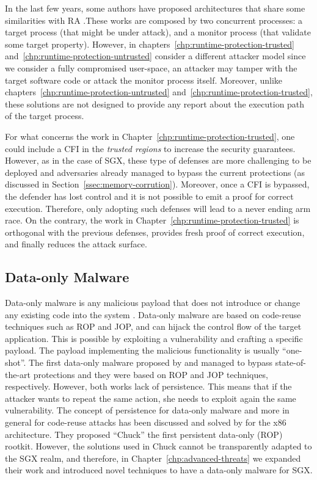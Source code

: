 In the last few years, some authors have proposed architectures that share some 
similarities with RA 
\citep{Ding:2017:EPP:3241189.3241201,Liu:2018:RED:3243734.3243826,Hu:2018:EUC:3243734.3243797}.These
works are composed by two concurrent processes: a target process (that might 
be under attack), and a monitor process (that validate some target property).
However, in chapters~\ref{chp:runtime-protection-trusted} 
and~\ref{chp:runtime-protection-untrusted} consider a different attacker model 
since we consider a fully compromised user-space, \ie an attacker may tamper 
with the target software code or attack the monitor process itself. 
Moreover, unlike chapters~\ref{chp:runtime-protection-untrusted} 
and~\ref{chp:runtime-protection-trusted}, these solutions are not designed to 
provide any report about the execution path of the target process. 

For what concerns the work in Chapter~\ref{chp:runtime-protection-trusted}, one 
could include a CFI in the \emph{trusted regions} to increase the security 
guarantees. However, as in the case of SGX, these type of defenses are more 
challenging to be deployed and adversaries already managed to bypass the
current protections (as discussed in Section~\ref{ssec:memory-corrution}).
Moreover, once a CFI is bypassed, the defender has lost control and it is not 
possible to emit a proof for correct execution.
Therefore, only adopting such defenses will lead to a never ending arm race.
On the contrary, the work in Chapter~\ref{chp:runtime-protection-trusted} is 
orthogonal with the previous defenses, provides fresh proof of correct 
execution, and finally reduces the attack surface.

\subsection{Data-only Malware}
\label{ssec:data-only-malware}

Data-only malware is any malicious payload that does not introduce or change 
any existing code into the system \citep{vogl2014persistent}.
Data-only malware are based on code-reuse techniques such as ROP and JOP, and 
can hijack the control flow of the target application. This is possible by 
exploiting a vulnerability and crafting a specific payload.
The payload implementing the malicious functionality is usually ``one-shot''. 
The first data-only malware proposed by \cite{hund} and \cite{chen} managed to 
bypass state-of-the-art 
protections and they were based on ROP and JOP techniques, respectively.
However, both works lack of persistence.
This means that if the attacker wants to repeat the same action, she needs to 
exploit again the same vulnerability.
The concept of persistence for data-only malware and more in general for 
code-reuse attacks has been discussed and solved by \cite{vogl2014persistent} 
for the x86 architecture. They proposed ``Chuck'' the first persistent 
data-only (ROP) rootkit. 
However, the solutions used in Chuck cannot be transparently adapted to the SGX 
realm, and therefore, in Chapter~\ref{chp:advanced-threats} we expanded their 
work and introduced novel techniques to have a data-only malware for SGX.